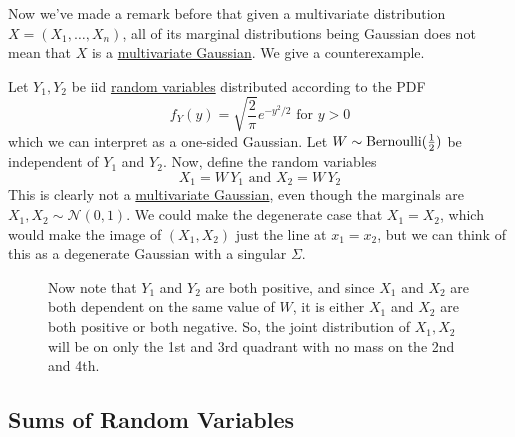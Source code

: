   Now we've made a remark before that given a multivariate distribution $X = (X_1, \ldots, X_n)$, all of its marginal distributions being Gaussian does not mean that $X$ is a \hyperref[def:multivariate-gaussian]{multivariate Gaussian}. We give a counterexample. 

  \begin{example}
    \label{ex:distribution-of-a-transformed-iid-pair}
  Let $Y_1, Y_2$ be iid \hyperref[def:random-variable]{random variables} distributed according to the PDF 
  \begin{equation}
    f_Y (y) = \sqrt{\frac{2}{\pi}} e^{-y^2 / 2} \text{ for } y > 0
  \end{equation}
  which we can interpret as a one-sided Gaussian. Let $W \sim \operatorname{Bernoulli}(\frac{1}{2})$ be independent of $Y_1$ and $Y_2$. Now, define the random variables 
  \begin{equation}
    X_1 = W \, Y_1 \text{ and } X_2 = W \, Y_2
  \end{equation}
  This is clearly not a \hyperref[def:multivariate-gaussian]{multivariate Gaussian}, even though the marginals are $X_1, X_2 \sim \mathcal{N}(0, 1)$. We could make the degenerate case that $X_1 = X_2$, which would make the image of $(X_1, X_2)$ just the line at $x_1 = x_2$, but we can think of this as a degenerate Gaussian with a singular $\Sigma$. 

  \begin{figure}[H]
    \centering 
    \caption{Now note that $Y_1$ and $Y_2$ are both positive, and since $X_1$ and $X_2$ are both dependent on the same value of $W$, it is either $X_1$ and $X_2$ are both positive or both negative. So, the joint distribution of $X_1, X_2$ will be on only the 1st and 3rd quadrant with no mass on the 2nd and 4th. }
    \label{fig:not_multi_gaussian}
  \end{figure}
  \end{example}

\subsection{Sums of Random Variables}

